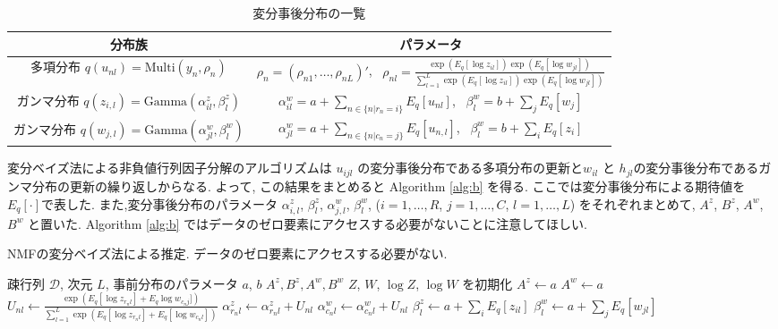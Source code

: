 \documentclass[a4paper,12pt]{jsarticle} %
\numberwithin{equation}{section} %
\begin{document}
\renewcommand{\arraystretch}{1.6}
\begin{table}
\centering
\caption{変分事後分布の一覧} \label{post1}
\begin{tabular}{cc}
\hline
分布族 & パラメータ\\
\hline
多項分布 $q(u_{nl}) = \mathrm{Multi}(y_n, \rho_n)$ & $\rho_n = (\rho_{n1},\dots, \rho_{nL})'$,~ $\displaystyle \rho_{nl} = \frac{\exp(E_q[\log z_{il}] )\exp(E_q[\log w_{jl}] )}{ \sum_{l=1}^L \exp(E_q[\log z_{il}] )\exp(E_q[\log w_{jl}] )}$\\
ガンマ分布 $q(z_{i,l}) = \mathrm{Gamma}(\alpha^z_{il}, \beta^z_l)$ & $\displaystyle \alpha^w_{il}=a+\sum_{n \in \{n|r_n=i\}} E_q[u_{nl}]$,~ $\displaystyle \beta^w_{l} = b+\sum_j E_q[w_j]$\\
ガンマ分布 $q(w_{j,l}) = \mathrm{Gamma}(\alpha^w_{jl}, \beta^w_{l})$ & $\displaystyle \alpha^w_{jl}=a+\sum_{n \in \{n|c_n=j\}} E_q[u_{n,l}]$,~ $\displaystyle \beta^w_{l} = b+\sum_i E_q[z_i]$ \\
\hline
\end{tabular}
\end{table}
\renewcommand{\arraystretch}{1}

変分ベイズ法による非負値行列因子分解のアルゴリズムは $u_{ijl}$ の変分事後分布である多項分布の更新と$w_{il}$ と $h_{jl}$の変分事後分布であるガンマ分布の更新の繰り返しからなる. 
よって, この結果をまとめると Algorithm \ref{alg:b} を得る. ここでは変分事後分布による期待値を$E_q[\cdot]$で表した. また,変分事後分布のパラメータ $\alpha^z_{i,l}$, $\beta^z_{l}$, $\alpha^w_{j,l}$, $\beta^w_{l}$, ($i=1,\ldots, R$, $j=1,\ldots, C$, $l=1, \ldots ,L$) をそれぞれまとめて, $A^z$, $B^z$, $A^w$, $B^w$ と置いた. Algorithm \ref{alg:b} ではデータのゼロ要素にアクセスする必要がないことに注意してほしい.

\begin{algorithm}[tbp]
\caption{NMFの変分ベイズ法による推定. データのゼロ要素にアクセスする必要がない. }\label{alg:b}
\begin{algorithmic}
\Require \Require 疎行列 $\mathcal{D}$, 次元 $L$, 事前分布のパラメータ $a$, $b$
\Ensure $A^z, B^z, A^w, B^w$ 
\State $Z$, $W$, $\log Z$, $\log W$ を初期化  
\State $A^z \leftarrow  a$  
\State $A^w \leftarrow a$
 
    \State $\displaystyle U_{nl} \leftarrow  \frac{\exp(E_q[\log z_{r_nl}] + E_q\log w_{c_n j}] )}{ \sum_{l=1}^L \exp(E_q[\log z_{r_nl}]+E_q[\log w_{c_n l}] )}$  
    \State $\alpha^z_{r_n l}  \leftarrow \alpha^z_{r_n l} + U_{nl}$ 
    \State $\alpha^w_{c_n l} \leftarrow  \alpha^w_{c_n l}+ U_{nl}$
\EndFor
    \EndFor
    \State $\beta^z_{l}  \leftarrow  a +  \sum_i E_q[z_{il}]$
    \State $\beta^w_{l}  \leftarrow a + \sum_j E_q[w_{jl}]$
        \EndFor
\EndWhile
\end{algorithmic}
\end{algorithm}
\end{document}

